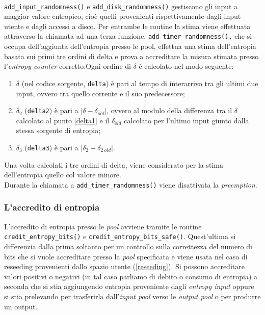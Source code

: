 \documentclass{article}
\begin{document}
 \paragraph{}\verb+add_input_randomness()+ e \verb+add_disk_randomness()+
 gestiscono gli input a maggior valore entropico, cioè quelli provenienti
 rispettivamente dagli input utente e dagli accessi a disco. Per entrambe le
 routine la stima viene effettuata attraverso la chiamata ad una terza funzione,
 \verb+add_timer_randomness(),+ che si occupa dell'aggiunta dell'entropia presso
 le pool, effettua una stima dell'entropia basata sui primi tre ordini di delta
 e prova a accreditare la misura stimata presso l'\emph{entropy counter}
 corretto.\newline{}Ogni ordine di $\delta$ è calcolato nel modo seguente:
 \begin{enumerate}
   \item $\delta$ (nel codice sorgente, \verb+delta+) è pari al tempo di
   interarrivo tra gli ultimi due input, ovvero tra quello corrente e il suo
   predecessore;\label{delta1}
   \item $\delta_2$ (\verb+delta2+) è pari a $|\delta-\delta_{old}|$, ovvero al
   modulo della differenza tra il $\delta$ calcolato al punto \ref{delta1} e il
   $\delta_{old}$ calcolato per l'ultimo input giunto dalla stessa sorgente di entropia;
   \item $\delta_3$ (\verb+delta3+) è pari a $|\delta_2-\delta_{2\ old}|$.
 \end{enumerate}
 Una volta calcolati i tre ordini di delta, viene considerato per la stima
 dell'entropia quello col valore minore.\\ Durante la chiamata a
 \verb+add_timer_randomness()+ viene disattivata la \emph{preemption}.
 
 \subsubsection{L'accredito di entropia}\label{credit}
 L'accredito di entropia presso le \emph{pool} avviene tramite le routine
 \verb+credit_entropy_bits()+ e \newline{}\verb+credit_entropy_bits_safe()+.
 Quest'ultima si differenzia dalla prima soltanto per un controllo sulla correttezza del
 numero di bits che si vuole accreditare presso la \emph{pool} specificata e
 viene usata nel caso di reseeding provenienti dallo spazio utente
 (\ref{reseeding}).
 \newline{}Si possono accreditare valori positivi o negativi (in tal caso
 parliamo di debito o consumo di entropia) a seconda che si stia aggiungendo
 entropia proveniente dagli \emph{entropy input} oppure si stia prelevando per
 trasferirla dall'\emph{input pool} verso le \emph{output pool} o per produrre un output. 
\end{document}
